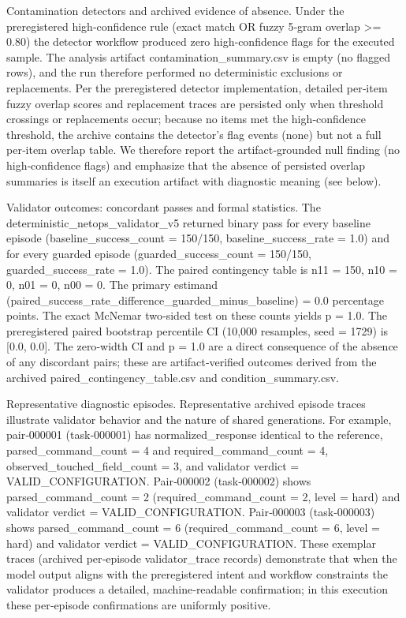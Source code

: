 \documentclass[conference]{IEEEtran}
\begin{document}
Contamination detectors and archived evidence of absence. Under the preregistered high‑confidence rule (exact match OR fuzzy 5‑gram overlap >= 0.80) the detector workflow produced zero high‑confidence flags for the executed sample. The analysis artifact contamination\_summary.csv is empty (no flagged rows), and the run therefore performed no deterministic exclusions or replacements. Per the preregistered detector implementation, detailed per‑item fuzzy overlap scores and replacement traces are persisted only when threshold crossings or replacements occur; because no items met the high‑confidence threshold, the archive contains the detector's flag events (none) but not a full per‑item overlap table. We therefore report the artifact‑grounded null finding (no high‑confidence flags) and emphasize that the absence of persisted overlap summaries is itself an execution artifact with diagnostic meaning (see below).

Validator outcomes: concordant passes and formal statistics. The deterministic\_netops\_validator\_v5 returned binary pass for every baseline episode (baseline\_success\_count = 150/150, baseline\_success\_rate = 1.0) and for every guarded episode (guarded\_success\_count = 150/150, guarded\_success\_rate = 1.0). The paired contingency table is n11 = 150, n10 = 0, n01 = 0, n00 = 0. The primary estimand (paired\_success\_rate\_difference\_guarded\_minus\_baseline) = 0.0 percentage points. The exact McNemar two‑sided test on these counts yields p = 1.0. The preregistered paired bootstrap percentile CI (10,000 resamples, seed = 1729) is [0.0, 0.0]. The zero‑width CI and p = 1.0 are a direct consequence of the absence of any discordant pairs; these are artifact‑verified outcomes derived from the archived paired\_contingency\_table.csv and condition\_summary.csv.

Representative diagnostic episodes. Representative archived episode traces illustrate validator behavior and the nature of shared generations. For example, pair‑000001 (task‑000001) has normalized\_response identical to the reference, parsed\_command\_count = 4 and required\_command\_count = 4, observed\_touched\_field\_count = 3, and validator verdict = VALID\_CONFIGURATION. Pair‑000002 (task‑000002) shows parsed\_command\_count = 2 (required\_command\_count = 2, level = hard) and validator verdict = VALID\_CONFIGURATION. Pair‑000003 (task‑000003) shows parsed\_command\_count = 6 (required\_command\_count = 6, level = hard) and validator verdict = VALID\_CONFIGURATION. These exemplar traces (archived per‑episode validator\_trace records) demonstrate that when the model output aligns with the preregistered intent and workflow constraints the validator produces a detailed, machine‑readable confirmation; in this execution these per‑episode confirmations are uniformly positive.
\end{document}
